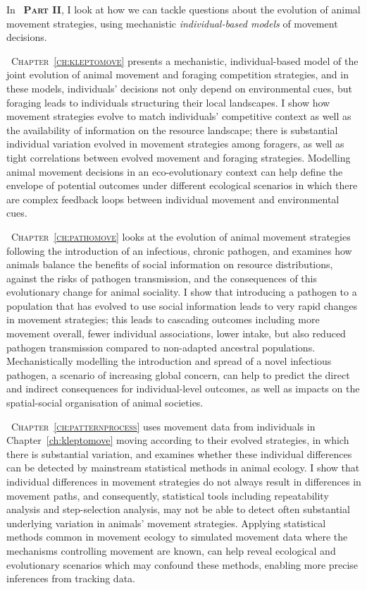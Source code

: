 \medskip

\noindent In {\scshape~\textbf{Part II}}, I look at how we can tackle questions about the evolution of animal movement strategies, using mechanistic \textit{individual-based models} of movement decisions.

\medskip

{\scshape~Chapter~\ref{ch:kleptomove}} presents a mechanistic, individual-based model of the joint evolution of animal movement and foraging competition strategies, and in these models, individuals' decisions not only depend on environmental cues, but foraging leads to individuals structuring their local landscapes.
I show how movement strategies evolve to match individuals' competitive context as well as the availability of information on the resource landscape; there is substantial individual variation evolved in movement strategies among foragers, as well as tight correlations between evolved movement and foraging strategies.
Modelling animal movement decisions in an eco-evolutionary context can help define the envelope of potential outcomes under different ecological scenarios in which there are complex feedback loops between individual movement and environmental cues.

{\scshape~Chapter~\ref{ch:pathomove}} looks at the evolution of animal movement strategies following the introduction of an infectious, chronic pathogen, and examines how animals balance the benefits of social information on resource distributions, against the risks of pathogen transmission, and the consequences of this evolutionary change for animal sociality.
I show that introducing a pathogen to a population that has evolved to use social information leads to very rapid changes in movement strategies; this leads to cascading outcomes including more movement overall, fewer individual associations, lower intake, but also reduced pathogen transmission compared to non-adapted ancestral populations.
Mechanistically modelling the introduction and spread of a novel infectious pathogen, a scenario of increasing global concern, can help to predict the direct and indirect consequences for individual-level outcomes, as well as impacts on the spatial-social organisation of animal societies.

{\scshape~Chapter~\ref{ch:patternprocess}} uses movement data from individuals in Chapter~\ref{ch:kleptomove} moving according to their evolved strategies, in which there is substantial variation, and examines whether these individual differences can be detected by mainstream statistical methods in animal ecology.
I show that individual differences in movement strategies do not always result in differences in movement paths, and consequently, statistical tools including repeatability analysis and step-selection analysis, may not be able to detect often substantial underlying variation in animals' movement strategies.
Applying statistical methods common in movement ecology to simulated movement data where the mechanisms controlling movement are known, can help reveal ecological and evolutionary scenarios which may confound these methods, enabling more precise inferences from tracking data.




\endgroup

\vfill

{\centering{}}

\cleardoublepage
